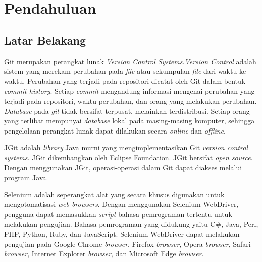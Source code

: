 \chapter{Pendahuluan}
\label{chap:intro}
   
\section{Latar Belakang}
\label{sec:label}
Git merupakan perangkat lunak \textit{Version Control Systems}\cite{chacon2014pro}.\textit{Version Control} adalah sistem yang merekam perubahan pada \textit{file} atau sekumpulan \textit{file} dari waktu ke waktu. Perubahan yang terjadi pada repositori dicatat oleh Git dalam bentuk \textit{commit history}. Setiap \textit{commit} mengandung informasi mengenai perubahan yang terjadi pada repositori, waktu perubahan, dan orang yang melakukan perubahan. \textit{Database} pada \textit{git} tidak bersifat terpusat, melainkan terdistribusi. Setiap orang yang terlibat mempunyai \textit{database} lokal pada masing-masing komputer, sehingga pengelolaan perangkat lunak dapat dilakukan secara \textit{online} dan \textit{offline}.

JGit adalah \textit{library} Java murni yang mengimplementasikan Git \textit{version control systems}\cite{JGit}. JGit dikembangkan oleh Eclipse Foundation. JGit bersifat \textit{open source}. Dengan menggunakan JGit, operasi-operasi dalam Git dapat diakses melalui program Java. 

Selenium adalah seperangkat alat yang secara khusus digunakan untuk mengotomatisasi \textit{web browsers}\cite{Selenium}. Dengan menggunakan Selenium WebDriver, pengguna dapat memasukkan \textit{script} bahasa pemrograman tertentu untuk melakukan pengujian. Bahasa pemrograman yang didukung yaitu C\#, Java, Perl, PHP, Python, Ruby, dan JavaScript. Selenium WebDriver dapat melakukan pengujian pada Google Chrome \textit{browser},  Firefox \textit{browser}, Opera \textit{browser}, Safari \textit{browser}, Internet Explorer \textit{browser}, dan Microsoft Edge \textit{browser}.  



